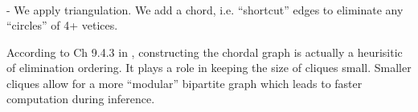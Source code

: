 \begin{frame}\frametitle{\subsubsecname}

	

	\\
	
	\pause 
	
	- We apply triangulation. We add a chord, i.e. ``shortcut'' edges to eliminate any ``circles'' of 4+ vetices.
	
	\pause 
	
	According to Ch 9.4.3 in \citep{koller2009probabilistic}, constructing the chordal graph is actually a heurisitic of elimination ordering. It plays a role in keeping the size of cliques small. Smaller cliques allow for a more ``modular'' bipartite graph which leads to faster computation during inference.
	
\end{frame}


